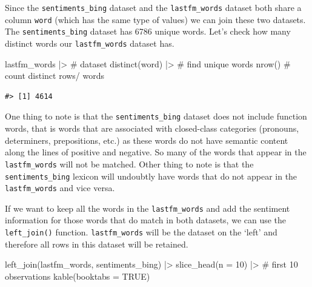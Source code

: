 \documentclass[
  letterpaper,
]{latex/krantz}
\newenvironment{Shaded}{\begin{snugshade}}{\end{snugshade}}
\newcommand{\AttributeTok}[1]{\textcolor[rgb]{0.40,0.45,0.13}{#1}}
\newcommand{\CommentTok}[1]{\textcolor[rgb]{0.37,0.37,0.37}{#1}}
\newcommand{\ConstantTok}[1]{\textcolor[rgb]{0.56,0.35,0.01}{#1}}
\newcommand{\DecValTok}[1]{\textcolor[rgb]{0.68,0.00,0.00}{#1}}
\newcommand{\FunctionTok}[1]{\textcolor[rgb]{0.28,0.35,0.67}{#1}}
\newcommand{\NormalTok}[1]{\textcolor[rgb]{0.00,0.23,0.31}{#1}}
\newcommand{\SpecialCharTok}[1]{\textcolor[rgb]{0.37,0.37,0.37}{#1}}
\begin{document}
Since the \texttt{sentiments\_bing} dataset and the
\texttt{lastfm\_words} dataset both share a column \texttt{word} (which
has the same type of values) we can join these two datasets. The
\texttt{sentiments\_bing} dataset has 6786 unique words. Let's check how
many distinct words our \texttt{lastfm\_words} dataset has.

\begin{Shaded}
\begin{Highlighting}[]
\NormalTok{lastfm\_words }\SpecialCharTok{|\textgreater{}} \CommentTok{\# dataset}
  \FunctionTok{distinct}\NormalTok{(word) }\SpecialCharTok{|\textgreater{}} \CommentTok{\# find unique words}
  \FunctionTok{nrow}\NormalTok{() }\CommentTok{\# count distinct rows/ words}
\end{Highlighting}
\end{Shaded}

\begin{verbatim}
#> [1] 4614
\end{verbatim}

One thing to note is that the \texttt{sentiments\_bing} dataset does not
include function words, that is words that are associated with
closed-class categories (pronouns, determiners, prepositions, etc.) as
these words do not have semantic content along the lines of positive and
negative. So many of the words that appear in the \texttt{lastfm\_words}
will not be matched. Other thing to note is that the
\texttt{sentiments\_bing} lexicon will undoubtly have words that do not
appear in the \texttt{lastfm\_words} and vice versa.

If we want to keep all the words in the \texttt{lastfm\_words} and add
the sentiment information for those words that do match in both
datasets, we can use the \texttt{left\_join()} function.
\texttt{lastfm\_words} will be the dataset on the `left' and therefore
all rows in this dataset will be retained.

\begin{Shaded}
\begin{Highlighting}[]
\FunctionTok{left\_join}\NormalTok{(lastfm\_words, sentiments\_bing) }\SpecialCharTok{|\textgreater{}} 
  \FunctionTok{slice\_head}\NormalTok{(}\AttributeTok{n =} \DecValTok{10}\NormalTok{) }\SpecialCharTok{|\textgreater{}} \CommentTok{\# first 10 observations}
  \FunctionTok{kable}\NormalTok{(}\AttributeTok{booktabs =} \ConstantTok{TRUE}\NormalTok{)}
\end{Highlighting}
\end{Shaded}
\end{document}
